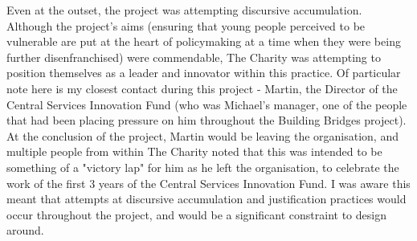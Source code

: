 Even at the outset, the project was attempting discursive accumulation. Although the project's aims (ensuring that young people perceived to be vulnerable are put at the heart of policymaking at a time when they were being further disenfranchised) were commendable, The Charity was attempting to position themselves as a leader and innovator within this practice. Of particular note here is my closest contact during this project - Martin, the Director of the Central Services Innovation Fund (who was Michael's manager, one of the people that had been placing pressure on him throughout the Building Bridges project). At the conclusion of the project, Martin would be leaving the organisation, and multiple people from within The Charity noted that this was intended to be something of a "victory lap" for him as he left the organisation, to celebrate the work of the first 3 years of the Central Services Innovation Fund. I was aware this meant that attempts at discursive accumulation and justification practices would occur throughout the project, and would be a significant constraint to design around. 

